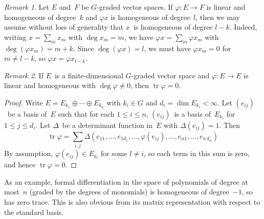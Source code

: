 \documentclass[letterpaper,12pt]{article}
\DeclareMathOperator{\tr}{tr}
\newcommand{\dsum}{\oplus}
\theoremstyle{definition}
\theoremstyle{remark}
\newtheorem*{rmk}{Remark}
\begin{document}
\begin{rmk}
Let \(E\) and~\(F\) be \(G\)-graded vector spaces. If \(\varphi:E\to F\) is linear and homogeneous of degree~\(k\) and \(\varphi x\) is homogeneous of degree~\(l\), then we may assume without loss of generality that \(x\)~is homogeneous of degree \(l-k\). Indeed, writing \(x=\sum_m x_m\) with \(\deg x_m=m\), we have \(\varphi x=\sum_m\varphi x_m\) with \(\deg(\varphi x_m)=m+k\). Since \(\deg(\varphi x)=l\), we must have \(\varphi x_m=0\) for \(m\ne l-k\), so \(\varphi x=\varphi x_{l-k}\).
\end{rmk}

\begin{rmk}
If \(E\)~is a finite-dimensional \(G\)-graded vector space and \(\varphi:E\to E\) is linear and homogeneous with \(\deg\varphi\ne 0\), then \(\tr\varphi=0\).
\end{rmk}
\begin{proof}
Write \(E=E_{k_1}\dsum\cdots\dsum E_{k_n}\) with \(k_i\in G\) and \(d_i=\dim E_{k_i}<\infty\). Let \((e_{ij})\)~be a basis of~\(E\) such that for each \(1\le i\le n\), \((e_{ij})\)~is a basis of~\(E_{k_i}\) for \(1\le j\le d_i\). Let \(\Delta\)~be a determinant function in~\(E\) with \(\Delta(e_{ij})=1\). Then
\[\tr\varphi=\sum_{i,j}\Delta(e_{11},\ldots,e_{1d_1},\ldots,\varphi(e_{ij}),\ldots,e_{n1},\ldots,e_{n\,d_n})\]
By assumption, \(\varphi(e_{ij})\in E_{k_l}\) for some \(l\ne i\), so each term in this sum is zero, and hence \(\tr\varphi=0\).
\end{proof}
\noindent As an example, formal differentiation in the space of polynomials of degree at most~\(n\) (graded by the degrees of monomials) is homogeneous of degree~\(-1\), so has zero trace. This is also obvious from its matrix representation with respect to the standard basis.
\end{document}
